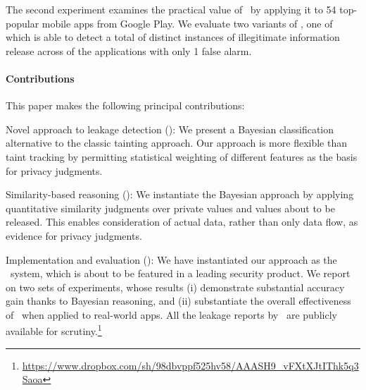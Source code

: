 The second experiment examines the practical value of \Tool\ by applying it to 54 top-popular mobile apps from Google Play. We evaluate two variants of \Tool, one of which is able to detect a total of  distinct instances of illegitimate information release across  of the applications with only 1 false alarm.

\paragraph{Contributions} This paper makes the following principal contributions:
\begin{compactenum}
	\item Novel approach to leakage detection (): We present a Bayesian classification alternative to the classic tainting approach. Our approach is more flexible than taint
	tracking by permitting statistical weighting of different features as the basis for privacy judgments.
	\item Similarity-based reasoning (): We instantiate the Bayesian approach by applying quantitative similarity judgments over private values and values
	about to be released. This enables consideration of actual data, rather than only data flow, as evidence for privacy judgments.
	\item Implementation and evaluation (): We have instantiated our approach as the \Tool\ system, which is about to be featured in a leading security product. We report on two sets of experiments, whose results (i) demonstrate substantial accuracy gain thanks to Bayesian reasoning, and (ii) substantiate the overall effectiveness of \Tool\ when applied to real-world apps. All the leakage reports by \Tool\ are publicly available for scrutiny.\footnote{
		{\scriptsize \href{https://www.dropbox.com/sh/98dbvppf525hv58/AAASH9\_vFXtXJtIThk5q3Saoa}{https://www.dropbox.com/sh/98dbvppf525hv58/AAASH9\_vFXtXJtIThk5q3Saoa}}
	}
\end{compactenum}








